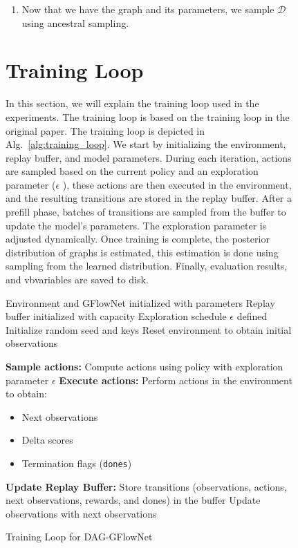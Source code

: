 \documentclass{lxaiproposal}
\begin{document}
\begin{figure}[h]
\begin{enumerate}
        \item Now that we have the graph and its parameters, we sample $\mathcal{D}$ using ancestral sampling.
    \end{enumerate}


    \section{Training Loop}\label{app:training_loop}
    \vspace*{-3mm}

    In this section, we will explain the training loop used in the experiments. The training loop is based on the
    training loop in the original paper. The training loop is depicted in Alg.~\ref{alg:training_loop}.
    We start by initializing the environment, replay buffer, and model parameters.
    During each iteration, actions are sampled based on the current policy and an exploration parameter ($\epsilon$
    ), these actions are then executed in the environment, and the resulting transitions are stored in the replay
    buffer. After a prefill
    phase, batches of transitions are sampled from the buffer to update the model's parameters. The exploration
    parameter is adjusted dynamically. Once training is complete, the posterior distribution of graphs is estimated,
    this estimation is done using sampling from the learned distribution. Finally, evaluation results, and
    vbvariables are saved to disk.


    \begin{algorithm}[H]
        \caption{Training Loop for DAG-GFlowNet}
        \begin{algorithmic}[1]
            \Require Environment and GFlowNet initialized with parameters
            \Require Replay buffer initialized with capacity
            \Require Exploration schedule $\epsilon$ defined
            \State Initialize random seed and keys
            \State Reset environment to obtain initial observations

                \State \textbf{Sample actions:} Compute actions using policy with exploration parameter $\epsilon$
                \State \textbf{Execute actions:} Perform actions in the environment to obtain:
                \begin{itemize}
                    \item Next observations
                    \item Delta scores
                    \item Termination flags (\texttt{dones})
                \end{itemize}
                \State \textbf{Update Replay Buffer:} Store transitions (observations, actions, next observations, rewards, and dones) in the buffer
                \State Update observations with next observations


\end{algorithmic}
\end{algorithm}
\end{figure}
\end{document}
